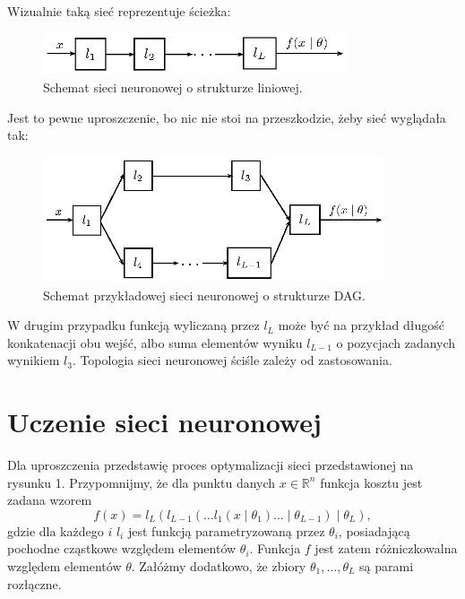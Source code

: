 \noindent
Wizualnie taką sieć reprezentuje ścieżka:

\begin{figure}[H]
  \centering
    \includegraphics[width=0.8\textwidth]{chapter1/img/prosta.eps}
  \caption{\small{Schemat sieci neuronowej o strukturze liniowej.}}
\end{figure}

\noindent
Jest to pewne uproszczenie, bo nic nie stoi na przeszkodzie, żeby sieć wyglądała tak:

\begin{figure}[H]
  \centering
    \includegraphics[width=0.9\textwidth]{chapter1/img/dag.eps}
  \caption{\small{Schemat przykładowej sieci neuronowej o strukturze DAG.}}
\end{figure}

W drugim przypadku funkcją wyliczaną przez $l_L$ może być na przykład długość konkatenacji obu wejść, albo suma elementów wyniku $l_{L-1}$ o pozycjach zadanych wynikiem $l_3$. Topologia sieci neuronowej ściśle zależy od zastosowania.


\section{Uczenie sieci neuronowej}
Dla uproszczenia przedstawię proces optymalizacji sieci przedstawionej na rysunku 1. Przypomnijmy, że dla punktu danych $x \in \mathbb{R}^n$ funkcja kosztu jest zadana wzorem
\[f(x) = l_L(l_{L-1}(\dots l_1(x \mid \theta_1) \dots \mid \theta_{L-1}) \mid \theta_L),\]
gdzie dla każdego $i$ $l_i$ jest funkcją parametryzowaną przez $\theta_i$, posiadającą pochodne cząstkowe względem elementów $\theta_i$. Funkcja $f$ jest zatem różniczkowalna względem elementów $\theta$. Załóżmy dodatkowo, że zbiory $\theta_1, \dots, \theta_L$ są parami rozłączne.


